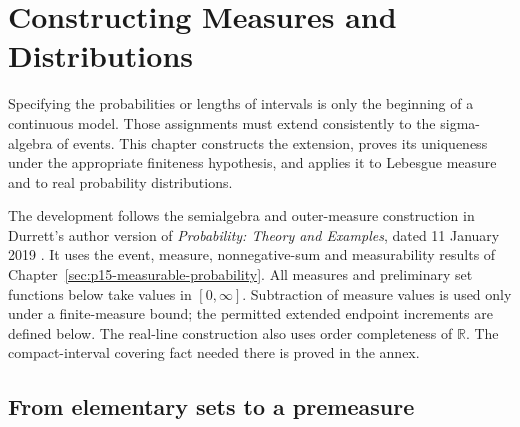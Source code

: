 \chapter{Constructing Measures and Distributions}
\label{sec:p15-measure-extension}

Specifying the probabilities or lengths of intervals is only the beginning
of a continuous model. Those assignments must extend consistently to the
sigma-algebra of events. This chapter constructs the extension, proves its
uniqueness under the appropriate finiteness hypothesis, and applies it to
Lebesgue measure and to real probability distributions.

The development follows the semialgebra and outer-measure construction in
Durrett's author version of \emph{Probability: Theory and Examples}, dated
11 January 2019 \cite[thms.~1.1.4, 1.1.9 and 1.2.2; app.~A.1]{DurrettPTEAuthor2019}.
It uses the event, measure, nonnegative-sum and measurability results of
Chapter~\ref{sec:p15-measurable-probability}. All measures and preliminary
set functions below take values in \([0,\infty]\). Subtraction of measure
values is used only under a finite-measure bound; the permitted extended
endpoint increments are defined below. The real-line construction
also uses order completeness of \(\mathbb R\). The compact-interval
covering fact needed there is proved in the annex.

\section{From elementary sets to a premeasure}
\label{sec:p15-extension-premeasure}

